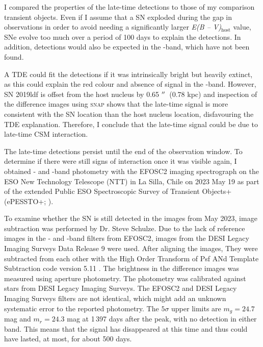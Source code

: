 \documentclass[a4paper,oneside,12pt, class=Latex/Classes/PhDthesisPSnPDF, crop=false]{standalone}
\begin{document}
I compared the properties of the late-time detections to those of my comparison transient objects. Even if I assume that a SN exploded during the gap in observations in order to avoid needing a significantly larger \textit{E(B -- V)}$_\text{host}$ value, SNe evolve too much over a period of 100 days to explain the detections. In addition, detections would also be expected in the \ztfg-band, which have not been found.

A TDE could fit the detections if it was intrinsically bright but heavily extinct, as this could explain the red colour and absence of signal in the \ztfg-band. However, SN 2019ldf is offset from the host nucleus by 0.65 $^{\prime\prime}$~(0.78 kpc) and inspection of the difference images using \textsc{snap} shows that the late-time signal is more consistent with the SN location than the host nucleus location, disfavouring the TDE explanation. Therefore, I conclude that the late-time signal could be due to late-time CSM interaction.

The late-time detections persist until the end of the observation window. To determine if there were still signs of interaction once it was visible again, I obtained \ztfg- and \ztfr-band photometry with the EFOSC2 imaging spectrograph \citep{EFOSC2} on the ESO New Technology Telescope (NTT) in La Silla, Chile on 2023 May 19 as part of the extended Public ESO Spectroscopic Survey of Transient Objects+ (ePESSTO+; \citealt{PESSTO}).

To examine whether the SN is still detected in the images from May 2023, image subtraction was performed by Dr. Steve Schulze. Due to the lack of reference images in the \ztfg- and \ztfr-band filters from EFOSC2, images from the DESI Legacy Imaging Surveys Data Release 9 \citep{DESI-Legacy_Imaging_Surveys} were used. After aligning the images, They were subtracted from each other with the High Order Transform of Psf ANd Template Subtraction code version 5.11 \citep[\textsc{hotpants};][]{HOTPANTS}. The brightness in the difference images was measured using aperture photometry. The photometry was calibrated against stars from DESI Legacy Imaging Surveys. The EFOSC2 and DESI Legacy Imaging Surveys filters are not identical, which might add an unknown systematic error to the reported photometry. The $5\sigma$ upper limits are $m_g = 24.7$ mag and $m_r = 24.3$ mag at 1\,397 days after the peak, with no detection in either band. This means that the signal has disappeared at this time and thus could have lasted, at most, for about 500 days.
\end{document}
